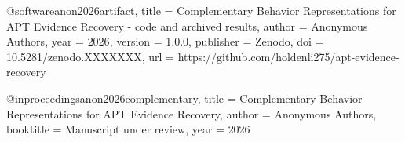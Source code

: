 %



@software{anon2026artifact,
  title        = {Complementary Behavior Representations for {APT} Evidence
                  Recovery - code and archived results},
  author       = {Anonymous Authors},
  year         = {2026},
  version      = {1.0.0},
  publisher    = {Zenodo},
  doi          = {10.5281/zenodo.XXXXXXX},
  url          = {https://github.com/holdenli275/apt-evidence-recovery}
}

@inproceedings{anon2026complementary,
  title     = {Complementary Behavior Representations for {APT} Evidence Recovery},
  author    = {Anonymous Authors},
  booktitle = {Manuscript under review},
  year      = {2026}
}
